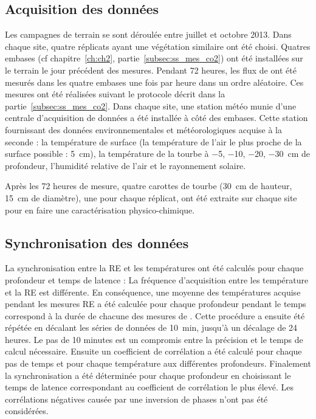 \subsection{Acquisition des données}
Les campagnes de terrain se sont déroulée entre juillet et octobre 2013.
Dans chaque site, quatre réplicats ayant une végétation similaire ont été choisi.
Quatres embases (cf chapitre~\ref{ch:ch2}, partie~\ref{subsec:ss_mes_co2}) ont été installées sur le terrain le jour précédent des mesures.
Pendant 72 heures, les flux de \coo ont été mesurés dans les quatre embases une fois par heure dans un ordre aléatoire.
Ces mesures ont été réalisées suivant le protocole décrit dans la partie~\ref{subsec:ss_mes_co2}.
Dans chaque site, une station météo munie d'une centrale d'acquisition de données a été installée à côté des embases.
Cette station fournissant des données environnementales et météorologiques acquise à la seconde : la température de surface (la température de l'air le plus proche de la surface possible : \SI{5}{\centi\metre}), la température de la tourbe à \num{-5}, \num{-10}, \num{-20}, \SI{-30}{\centi\metre} de profondeur, l'humidité relative de l'air et le rayonnement solaire.

Après les 72 heures de mesure, quatre carottes de tourbe (\SI{30}{\centi\metre} de hauteur, \SI{15}{\centi\metre} de diamètre), une pour chaque réplicat, ont été extraite sur chaque site pour en faire une caractérisation physico-chimique.

\subsection{Synchronisation des données}
La synchronisation entre la RE et les températures ont été calculés pour chaque profondeur et temps de latence :
La fréquence d'acquisition entre les température et la RE est différente.
En conséquence, une moyenne des températures acquise pendant les mesures RE a été calculée pour chaque profondeur pendant le temps correspond à la durée de chacune des mesures de \coo.
Cette procédure a ensuite été répétée en décalant les séries de données de \SI{10}{\minute}, jusqu'à un décalage de 24 heures.
Le pas de 10 minutes est un compromis entre la précision et le temps de calcul nécessaire.
Ensuite un coefficient de corrélation a été calculé pour chaque pas de temps et pour chaque température aux différentes profondeurs.
Finalement la synchronisation a été déterminée pour chaque profondeur en choisissant le temps de latence correspondant au coefficient de corrélation le plus élevé.
Les corrélations négatives causée par une inversion de phases n'ont pas été considérées.

